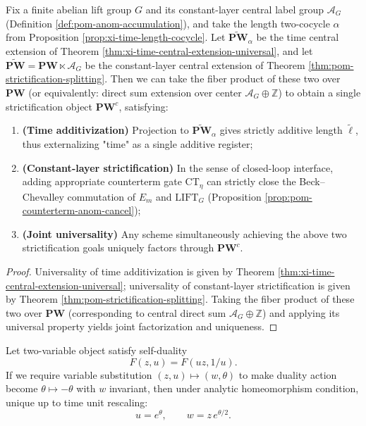 \begin{corollary}\label{cor:xi-double-central-extension-universal-strictification}
Fix a finite abelian lift group \(G\) and its constant-layer central label group \(\mathcal{A}_G\) (Definition \ref{def:pom-anom-accumulation}), and take the length two-cocycle \(\alpha\) from Proposition \ref{prop:xi-time-length-cocycle}.
Let \(\widetilde{\mathbf{PW}}_{\alpha}\) be the time central extension of Theorem \ref{thm:xi-time-central-extension-universal}, and let
\(\widetilde{\mathbf{PW}}=\mathbf{PW}\ltimes\mathcal{A}_G\)
be the constant-layer central extension of Theorem \ref{thm:pom-strictification-splitting}.
Then we can take the fiber product of these two over \(\mathbf{PW}\) (or equivalently: direct sum extension over center \(\mathcal{A}_G\oplus\mathbb Z\)) to obtain a single strictification object \(\mathbf{PW}^{c}\), satisfying:
\begin{enumerate}
  \item \textbf{(Time additivization)} Projection to \(\widetilde{\mathbf{PW}}_{\alpha}\) gives strictly additive length \(\widetilde\ell\), thus externalizing "time" as a single additive register;
  \item \textbf{(Constant-layer strictification)} In the sense of closed-loop interface, adding appropriate counterterm gate \(\mathrm{CT}_\eta\) can strictly close the Beck--Chevalley commutation of \(E_m\) and \(\mathrm{LIFT}_G\) (Proposition \ref{prop:pom-counterterm-anom-cancel});
  \item \textbf{(Joint universality)} Any scheme simultaneously achieving the above two strictification goals uniquely factors through \(\mathbf{PW}^{c}\).
\end{enumerate}
\end{corollary}
\begin{proof}
Universality of time additivization is given by Theorem \ref{thm:xi-time-central-extension-universal}; universality of constant-layer strictification is given by Theorem \ref{thm:pom-strictification-splitting}.
Taking the fiber product of these two over \(\mathbf{PW}\) (corresponding to central direct sum \(\mathcal{A}_G\oplus\mathbb Z\)) and applying its universal property yields joint factorization and uniqueness.
\end{proof}

\begin{proposition}\label{prop:xi-completed-coordinate-rigidity-time-reversal}
Let two-variable object satisfy self-duality
\[
F(z,u)=F(uz,1/u).
\]
If we require variable substitution \((z,u)\mapsto (w,\theta)\) to make duality action become
\(
\theta\mapsto-\theta
\)
with \(w\) invariant, then under analytic homeomorphism condition, unique up to time unit rescaling:
\[
u=e^{\theta},
\qquad
w=z\,e^{\theta/2}.
\]
\end{proposition}

